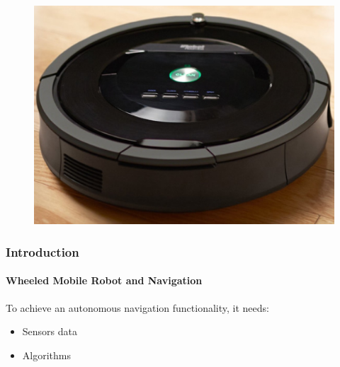\begin{frame}
\begin{figure}
\begin{minipage}{.3\linewidth}
		\end{minipage}
		\begin{minipage}{.3\linewidth}
			\centering
			\includegraphics[scale=0.12]{image/roomba}\footnotemark
		\end{minipage}
	\end{figure}
\end{frame}


\begin{frame}
	\frametitle{Introduction}
	\framesubtitle{Wheeled Mobile Robot and Navigation}
	To achieve an autonomous navigation functionality, it needs:
	\begin{itemize}
		\item Sensors data
		\item Algorithms
	\end{itemize}
\end{frame}


